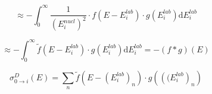 \documentclass{article}
\begin{document}
\begin{equation}
\label{convolution_approximation_2}
\approx - \int_{0}^{\infty} \frac{1}{\left( E_i^{nucl} \right)^2} \cdot f\left( E - E^{lab}_i \right) \cdot g \left( E^{lab}_i \right) \mathrm{d} E_i^{lab}
\end{equation}

\begin{equation}
\label{convolution_approximation_3}
	\approx - \int_{0}^{\infty} \tilde{f}\left( E - E^{lab}_i \right) \cdot g \left( E^{lab}_i \right) \mathrm{d} E_i^{lab} = -\left( f * g \right) \left( E \right)
\end{equation}

\begin{equation}
\label{discrete_convolution}
	\sigma^{D}_{0 \to i} (E) = \sum_n \tilde{f} \left( E -  \left(E^{lab}_i\right)_n \right) \cdot g \left( \left( (E^{lab}_i\right)_n \right)
\end{equation}
\newpage

{}

\end{document}
